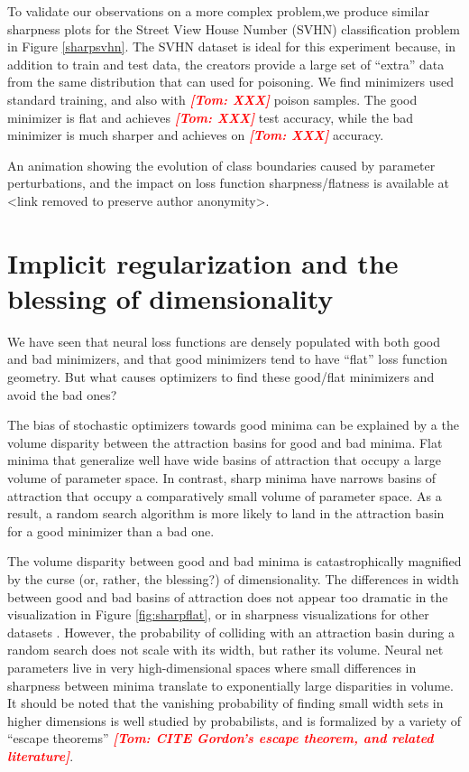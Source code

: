 \documentclass{article}
\newcommand{\tom}[1]{{  \textcolor{red}{\bf \em [Tom: #1]}}}
\begin{document}
To validate our observations on a more complex problem,we produce similar sharpness plots for the Street View House Number (SVHN) classification problem in Figure \ref{sharpsvhn}.  The SVHN dataset is ideal for this experiment because, in addition to train and test data, the creators provide a large set of ``extra'' data from the same distribution that can used for poisoning.  We find minimizers used standard training, and also with \tom{XXX} poison samples. The good minimizer is flat and achieves \tom{XXX} test accuracy, while the bad minimizer is much sharper and achieves on \tom{XXX} accuracy.

An animation showing the evolution of class boundaries caused by parameter perturbations, and the impact on loss function sharpness/flatness is available at <link removed to preserve author anonymity>.
%

\section{Implicit regularization and the blessing of dimensionality}
We have seen that neural loss functions are densely populated with both good and bad minimizers, and that good minimizers tend to have ``flat'' loss function geometry.  But what causes optimizers to find these good/flat minimizers and avoid the bad ones?

The bias of stochastic optimizers towards good minima can be explained by a the volume disparity between the attraction basins for good and bad minima.
Flat minima that generalize well have wide basins of attraction that occupy a large volume of parameter space.  In contrast, sharp minima have narrows basins of attraction that occupy a comparatively small volume of parameter space.  As a result, a random search algorithm is more likely to land in the attraction basin for a good minimizer than a bad one.


The volume disparity between good and bad minima is catastrophically magnified by the curse (or, rather, the blessing?) of dimensionality.   The differences in width between good and bad basins of attraction does not appear too dramatic in the visualization in Figure \ref{fig:sharpflat}, or in sharpness visualizations for other datasets \cite{li2018landscape}.  However, the probability of colliding with an attraction basin during a random search does not scale with its width, but rather its volume.   Neural net parameters live in very high-dimensional spaces where small differences in sharpness between minima translate to exponentially large disparities in volume.   It should be noted that the vanishing probability of finding small width sets in higher dimensions is well studied by probabilists, and is formalized by a variety of  ``escape theorems''  \tom{CITE Gordon's escape theorem, and related literature}.
\end{document}

